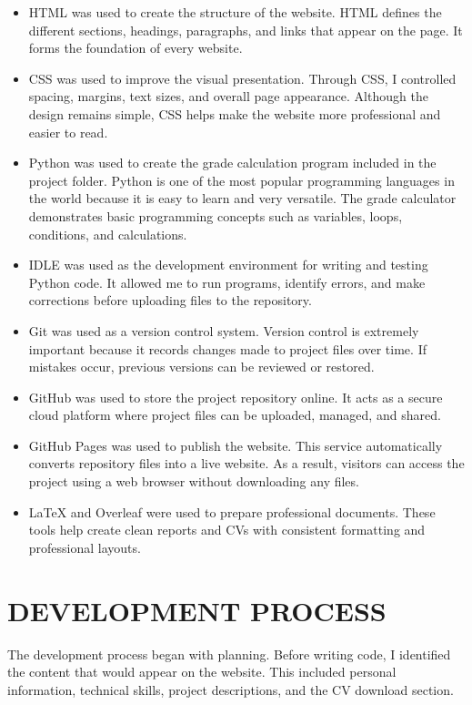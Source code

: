 \documentclass[12pt]{article}
\begin{document}
\begin{itemize}
    \item HTML was used to create the structure of the website. HTML defines the different sections, headings, paragraphs, and links that appear on the page. It forms the foundation of every website.
    \item CSS was used to improve the visual presentation. Through CSS, I controlled spacing, margins, text sizes, and overall page appearance. Although the design remains simple, CSS helps make the website more professional and easier to read.
    \item Python was used to create the grade calculation program included in the project folder. Python is one of the most popular programming languages in the world because it is easy to learn and very versatile. The grade calculator demonstrates basic programming concepts such as variables, loops, conditions, and calculations.
    \item IDLE was used as the development environment for writing and testing Python code. It allowed me to run programs, identify errors, and make corrections before uploading files to the repository.
    \item Git was used as a version control system. Version control is extremely important because it records changes made to project files over time. If mistakes occur, previous versions can be reviewed or restored.
    \item GitHub was used to store the project repository online. It acts as a secure cloud platform where project files can be uploaded, managed, and shared.
    \item GitHub Pages was used to publish the website. This service automatically converts repository files into a live website. As a result, visitors can access the project using a web browser without downloading any files.
    \item LaTeX and Overleaf were used to prepare professional documents. These tools help create clean reports and CVs with consistent formatting and professional layouts.
\end{itemize}

\section*{DEVELOPMENT PROCESS}
The development process began with planning. Before writing code, I identified the content that would appear on the website. This included personal information, technical skills, project descriptions, and the CV download section.
\end{document}
